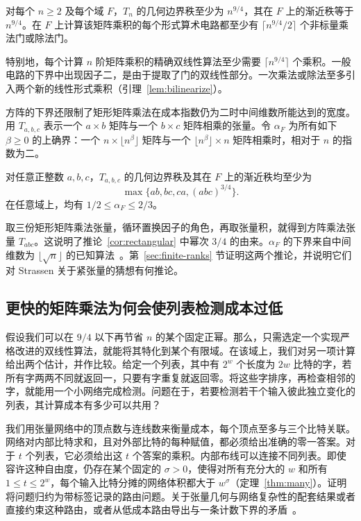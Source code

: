 \begin{corollary}\label{cor:tight}
对每个 \(n\ge2\) 及每个域 \(F\)，\(T_n\) 的几何边界秩至少为 \(n^{9/4}\)，其在 \(F\) 上的渐近秩等于 \(n^{9/4}\)。在 \(F\) 上计算该矩阵乘积的每个形式算术电路都至少有 \(\lceil n^{9/4}/2\rceil\) 个非标量乘法门或除法门。
\end{corollary}

特别地，每个计算 \(n\) 阶矩阵乘积的精确双线性算法至少需要 \(\lceil n^{9/4}\rceil\) 个乘积。一般电路的下界中出现因子二，是由于提取了门的双线性部分。一次乘法或除法至多引入两个新的线性形式乘积（引理~\ref{lem:bilinearize}）。

方阵的下界还限制了矩形矩阵乘法在成本指数仍为二时中间维数所能达到的宽度。用 \(T_{a,b,c}\) 表示一个 \(a\times b\) 矩阵与一个 \(b\times c\) 矩阵相乘的张量。令 \(\alpha_F\) 为所有如下 \(\beta\ge0\) 的上确界：一个 \(n\times\lfloor n^\beta\rfloor\) 矩阵与一个 \(\lfloor n^\beta\rfloor\times n\) 矩阵相乘时，相对于 \(n\) 的指数为二。

\begin{corollary}\label{cor:rectangular}
对任意正整数 \(a,b,c\)，\(T_{a,b,c}\) 的几何边界秩及其在 \(F\) 上的渐近秩均至少为
\[
              \max\{ab,bc,ca,(abc)^{3/4}\}.
\]
在任意域上，均有 \(1/2\le\alpha_F\le2/3\)。
\end{corollary}

取三份矩形矩阵乘法张量，循环置换因子的角色，再取张量积，就得到方阵乘法张量 \(T_{abc}\)。这说明了推论~\ref{cor:rectangular} 中幂次 \(3/4\) 的由来。\(\alpha_F\) 的下界来自中间维数为 \(\lfloor\sqrt n\rfloor\) 的已知算法~\cite{uznanski,abvz}。第~\ref{sec:finite-ranks} 节证明这两个推论，并说明它们对 Strassen 关于紧张量的猜想有何推论。

\subsection{更快的矩阵乘法为何会使列表检测成本过低}

假设我们可以在 \(9/4\) 以下再节省 \(n\) 的某个固定正幂。那么，只需选定一个实现严格改进的双线性算法，就能将其特化到某个有限域。在该域上，我们对另一项计算给出两个估计，并作比较。给定一个列表，其中有 \(2^w\) 个长度为 \(2w\) 比特的字，若所有字两两不同就返回一，只要有字重复就返回零。将这些字排序，再检查相邻的字，就能用一个小网络完成检测。问题在于，若要检测若干个输入彼此独立变化的列表，其计算成本有多少可以共用？

我们用张量网络中的顶点数与连线数来衡量成本，每个顶点至多与三个比特关联。网络对内部比特求和，且对外部比特的每种赋值，都必须给出准确的零一答案。对于 \(t\) 个列表，它必须给出这 \(t\) 个答案的乘积。内部布线可以连接不同列表。即使容许这种自由度，仍存在某个固定的 \(\sigma>0\)，使得对所有充分大的 \(w\) 和所有 \(1\le t\le2^w\)，每个输入比特分摊的网络体积都大于 \(w^\sigma\)（定理~\ref{thm:many}）。证明将问题归约为带标签记录的路由问题。关于张量几何与网络复杂性的配套结果或者直接约束这种路由，或者从低成本路由导出与一条计数下界的矛盾~\cite{oaG,oaP}。


